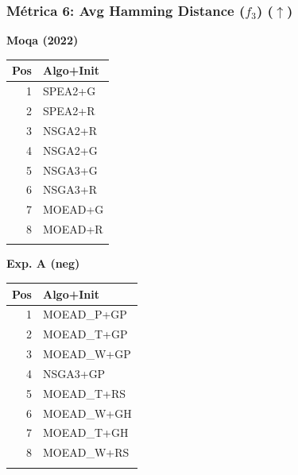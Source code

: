 \documentclass[a4paper,10pt]{article}
\begin{document}
\subsubsection{Métrica 6: Avg Hamming Distance (\texorpdfstring{$f_3$}{f3}) \texorpdfstring{($\uparrow$)}{(up)}}
\begin{table}[H]
    \centering
    \begin{minipage}[t]{0.32\textwidth}
        \centering\scriptsize\textbf{Moqa (2022)}\\
        \begin{tabular}{rl}
            \toprule
            Pos & Algo+Init \\ \midrule
            1 & SPEA2+G \\
            2 & SPEA2+R \\
            3 & NSGA2+R \\
            4 & NSGA2+G \\
            5 & NSGA3+G \\
            6 & NSGA3+R \\
            7 & MOEAD+G \\
            8 & MOEAD+R \\
            \\
            \bottomrule
        \end{tabular}
    \end{minipage}
    \hfill
    \begin{minipage}[t]{0.32\textwidth}
        \centering\scriptsize\textbf{Exp. A (neg)}\\
        \begin{tabular}{rl}
            \toprule
            Pos & Algo+Init \\ \midrule
            1 & MOEAD\_P+GP \\
            2 & MOEAD\_T+GP \\
            3 & MOEAD\_W+GP \\
            4 & NSGA3+GP \\
            5 & MOEAD\_T+RS \\
            6 & MOEAD\_W+GH \\
            7 & MOEAD\_T+GH \\
            8 & MOEAD\_W+RS \\
            \\
            \bottomrule
        \end{tabular}
    \end{minipage}
    \hfill
    \begin{minipage}[t]{0.32\textwidth}

\end{minipage}
\end{table}
\end{document}

